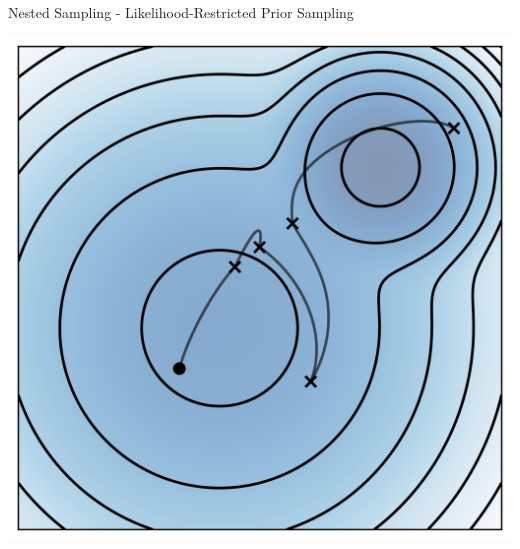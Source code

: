 \documentclass[]{beamer}
\begin{document}
\begin{frame}{Nested Sampling - Likelihood-Restricted Prior Sampling}
\begin{minipage}{0.45\textwidth}
      \includegraphics[scale=0.4]{figs/hmc_example.png}
    \end{minipage}
  \end{frame}
\end{document}
